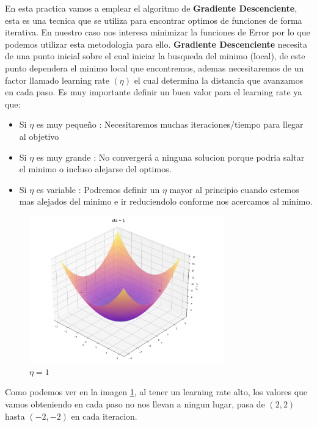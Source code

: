 En esta practica vamos a emplear el algoritmo de \textbf{Gradiente Descenciente}, 
esta es una tecnica que se utiliza para encontrar optimos de funciones de forma iterativa.
En nuestro caso nos interesa minimizar la funciones de Error por lo que podemos utilizar esta metodologia para ello.
\textbf{Gradiente Descenciente} necesita de una punto inicial sobre el cual iniciar la busqueda del 
minimo (local), de este punto dependera el minimo local que encontremos, ademas necesitaremos 
de un factor llamado learning rate $( \eta ) $ el cual determina la distancia que avanzamos en cada paso.
Es muy importante definir un buen valor para el learning rate ya que:
\begin{itemize}
  \item Si $\eta$ es muy pequeño : Necesitaremos muchas iteraciones/tiempo para llegar al objetivo
  \item Si $\eta$ es muy grande : No convergerá a ninguna solucion porque podria saltar el minimo o incluso alejarse del optimos.
  \item Si $\eta$ es variable : Podremos definir un $\eta$ mayor al principio cuando estemos mas alejados del minimo e ir reduciendolo conforme nos acercamos al minimo.
\end{itemize}

\begin{figure}[h]
  \centering
  \includegraphics[width=0.75\textwidth]{eta1}
  \caption{$\eta = 1$}
  \label{fig:eta1}
\end{figure}
Como podemos ver en la imagen \ref{fig:eta1}, al tener un learning rate alto, los valores que vamos obteniendo en cada
paso no nos llevan a ningun lugar, pasa de $(2,2)$ hasta $(-2,-2)$ en cada iteracion.

